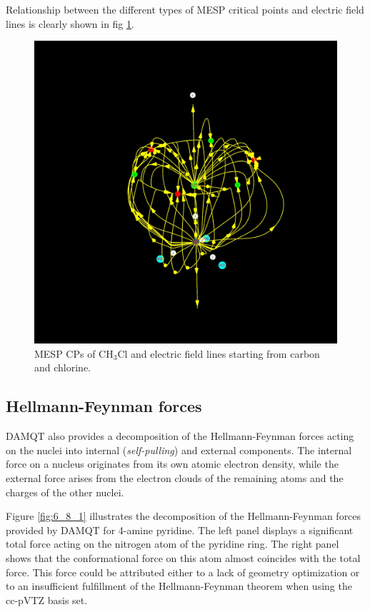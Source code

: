 \documentclass[10pt]{article}
\begin{document}
Relationship between the different types of MESP critical points and electric field lines is clearly shown in 
fig \ref{fig:6_7_2}.

\begin{figure}[H]
\begin{center}
\includegraphics[width=.27\linewidth]{CH3Cl-pVQZ_Cp_field.jpg}
\end{center}
\caption[MESP CPs and electric field of CH$_3$Cl]{ MESP CPs of CH$_3$Cl and electric field lines starting from carbon and chlorine.
\label{fig:6_7_2}}
\end{figure}

\subsection{Hellmann-Feynman forces \label{sec:6.8} }

DAMQT also provides a decomposition of the Hellmann-Feynman forces acting on the
nuclei into internal 
({\it self-pulling}) and 
external components. The internal force on a nucleus 
originates from its own atomic electron density, while the external force arises from 
the electron clouds of the remaining atoms and the charges of the other nuclei.

Figure \ref{fig:6_8_1} illustrates the decomposition of the Hellmann-Feynman forces 
provided by DAMQT for 4-amine pyridine. The left panel displays a significant total 
force acting on the nitrogen atom of the pyridine ring. The right panel shows that 
the conformational force on this atom almost coincides with the total force. 
This force could be attributed either to a lack of geometry optimization or to an 
insufficient fulfillment of the Hellmann-Feynman theorem when using the cc-pVTZ 
basis set.
\end{document}
